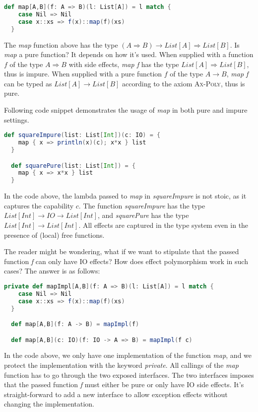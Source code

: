 \begin{lstlisting}[language=Scala]
  def map[A,B](f: A => B)(l: List[A]) = l match {
    case Nil => Nil
    case x::xs => f(x)::map(f)(xs)
  }
\end{lstlisting}

The \emph{map} function above has the type
$(A \Rightarrow B) \to List[A] \Rightarrow List[B]$. Is \emph{map} a
pure function? It depends on how it's used. When supplied with a
function $f$ of the type $A \Rightarrow B$ with side effects,
\emph{map f} has the type $List[A] \Rightarrow List[B]$, thus is
impure. When supplied with a pure function $f$ of the type $A \to B$,
\emph{map f} can be typed as $List[A] \to List[B]$ according to the
axiom \textsc{Ax-Poly}, thus is pure.

Following code snippet demonstrates the usage of \emph{map} in both
pure and impure settings.

\begin{lstlisting}[language=Scala]
  def squareImpure(list: List[Int])(c: IO) = {
    map { x => println(x)(c); x*x } list
  }

  def squarePure(list: List[Int]) = {
    map { x => x*x } list
  }
\end{lstlisting}

In the code above, the lambda passed to \emph{map} in
\emph{squareImpure} is not stoic, as it captures the capability
$c$. The function \emph{squareImpure} has the type
$List[Int] \to IO \to List[Int]$, and \emph{squarePure} has the type
$List[Int] \to List[Int]$. All effects are captured in the type system
even in the presence of (local) free functions.

The reader might be wondering, what if we want to stipulate that the
passed function \emph{f} can only have IO effects? How does effect
polymorphism work in such cases? The answer is as follows:

\begin{lstlisting}[language=Scala]
  private def mapImpl[A,B](f: A => B)(l: List[A]) = l match {
    case Nil => Nil
    case x::xs => f(x)::map(f)(xs)
  }

  def map[A,B](f: A -> B) = mapImpl(f)

  def map[A,B](c: IO)(f: IO -> A => B) = mapImpl(f c)
\end{lstlisting}

In the code above, we only have one implementation of the function
\emph{map}, and we protect the implementation with the keyword
\emph{private}. All callings of the \emph{map} function has to go
through the two exposed interfaces. The two interfaces imposes that
the passed function \emph{f} must either be pure or only have IO side
effects. It's straight-forward to add a new interface to allow
exception effects without changing the implementation.
